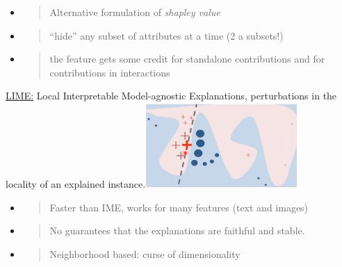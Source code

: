 \begin{itemize}
\item
  \begin{quote}
  Alternative formulation of \emph{shapley value}
  \end{quote}
\end{itemize}

\begin{itemize}
\item
  \begin{quote}
  ``hide'' any subset of attributes at a time (2 a subsets!)
  \end{quote}
\end{itemize}

\begin{itemize}
\item
  \begin{quote}
  the feature gets some credit for standalone contributions and for
  contributions in interactions
  \end{quote}
\end{itemize}

\underline{LIME:} Local Interpretable Model-agnostic Explanations,
perturbations in the locality of an explained
instance.\includegraphics[width=2.27342in,height=1.27262in]{media/image25.png}

\begin{itemize}
\item
  \begin{quote}
  Faster than IME, works for many features (text and images)
  \end{quote}
\end{itemize}

\begin{itemize}
\item
  \begin{quote}
  No guarantees that the explanations are faithful and stable.
  \end{quote}
\end{itemize}

\begin{itemize}
\item
  \begin{quote}
  Neighborhood based: curse of dimensionality
  \end{quote}
\end{itemize}


